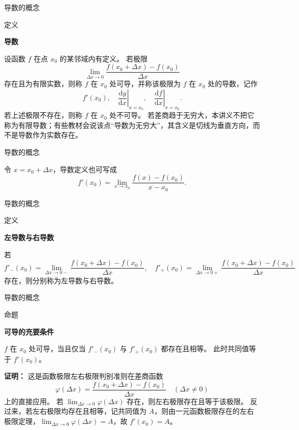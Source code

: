 \documentclass[aspectratio=169,10pt,fontset=fandol]{ctexbeamer}
\newcommand{\dd}{\mathrm{d}}
\begin{document}
\begin{frame}[t,fragile]{导数的概念}
\normalsize
\begin{block}{定义}
{\normalsize
\textbf{导数}\par

设函数 $f$ 在点 $x_0$ 的某邻域内有定义。 若极限
\[
\lim_{\Delta x\to0}\frac{f(x_0+\Delta x)-f(x_0)}{\Delta x}
\]
存在且为有限实数，则称 $f$ 在 $x_0$ 处可导，并称该极限为 $f$ 在 $x_0$ 处的导数，记作
\[
f'(x_0),\quad \left.\frac{\dd y}{\dd x}\right|_{x=x_0},\quad \left.\frac{\dd f}{\dd x}\right|_{x=x_0}.
\]
若上述极限不存在，则称 $f$ 在 $x_0$ 处不可导。 若差商趋于无穷大，本讲义不把它称为有限导数；有些教材会说该点“导数为无穷大”，其含义是切线为垂直方向，而不是导数作为实数存在。

}
\end{block}
\end{frame}
\begin{frame}[t,fragile]{导数的概念}
\normalsize
{\normalsize
令 $x=x_0+\Delta x$，导数定义也可写成
\[
f'(x_0)=\lim_{x\to x_0}\frac{f(x)-f(x_0)}{x-x_0}.
\]


}
\end{frame}
\begin{frame}[t,fragile]{导数的概念}
\normalsize
\begin{block}{定义}
{\normalsize
\textbf{左导数与右导数}\par

若
\[
f'_-(x_0)=\lim_{\Delta x\to0-}\frac{f(x_0+\Delta x)-f(x_0)}{\Delta x},\quad
f'_+(x_0)=\lim_{\Delta x\to0+}\frac{f(x_0+\Delta x)-f(x_0)}{\Delta x}
\]
存在，则分别称为左导数与右导数。

}
\end{block}
\end{frame}
\begin{frame}[t,fragile]{导数的概念}
\normalsize
\begin{block}{命题}
{\normalsize
\textbf{可导的充要条件}\par

$f$ 在 $x_0$ 处可导，当且仅当 $f'_-(x_0)$ 与 $f'_+(x_0)$ 都存在且相等。 此时共同值等于 $f'(x_0)$。

}
\end{block}
\pause
{\normalsize
\textbf{证明：}
这是函数极限左右极限判别准则在差商函数
\[
\varphi(\Delta x)=\frac{f(x_0+\Delta x)-f(x_0)}{\Delta x}\quad(\Delta x\neq0)
\]
上的直接应用。 若 $\lim_{\Delta x\to0}\varphi(\Delta x)$ 存在，则左右极限存在且等于该极限。 反过来，若左右极限均存在且相等，记共同值为 $A$，则由一元函数极限存在的左右极限定理，$\lim_{\Delta x\to0}\varphi(\Delta x)=A$，故 $f'(x_0)=A$。

}
\end{frame}
\end{document}
